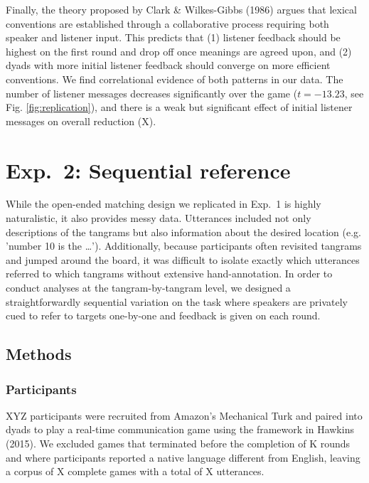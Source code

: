 \documentclass[alpha-refs]{wiley-article}
\begin{document}
Finally, the theory proposed by Clark \& Wilkes-Gibbs (1986) argues that
lexical conventions are established through a collaborative process
requiring both speaker and listener input. This predicts that (1)
listener feedback should be highest on the first round and drop off once
meanings are agreed upon, and (2) dyads with more initial listener
feedback should converge on more efficient conventions. We find
correlational evidence of both patterns in our data. The number of
listener messages decreases significantly over the game (\(t = -13.23\),
see Fig. \ref{fig:replication}), and there is a weak but significant
effect of initial listener messages on overall reduction (X).


\section{Exp.~2: Sequential reference}\label{task2}

While the open-ended matching design we replicated in Exp.~1 is highly naturalistic, it also provides messy data. Utterances included not only descriptions of the tangrams but also information about the desired location (e.g. 'number 10 is the \dots'). Additionally, because participants often revisited tangrams and jumped around the board, it was difficult to isolate exactly which utterances referred to which tangrams without extensive hand-annotation. In order to conduct analyses at the tangram-by-tangram level, we designed a straightforwardly sequential variation on the task where speakers are privately cued to refer to targets one-by-one and feedback is given on each round. 

\subsection{Methods}\label{methods}

\subsubsection{Participants}\label{participants}

XYZ participants were recruited from Amazon's Mechanical Turk and paired
into dyads to play a real-time communication game using the framework in
Hawkins (2015). We excluded games that terminated before the completion
of K rounds and where participants reported a native language different
from English, leaving a corpus of X complete games with a total of
X utterances.
\end{document}
